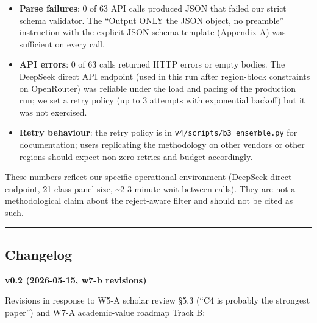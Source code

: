 \documentclass[
  letterpaper,
  11pt]{article}
\providecommand{\tightlist}{%
  \setlength{\itemsep}{0pt}\setlength{\parskip}{0pt}}
\begin{document}
\begin{itemize}
\tightlist
\item
  \textbf{Parse failures}: 0 of 63 API calls produced JSON that failed
  our strict schema validator. The ``Output ONLY the JSON object, no
  preamble'' instruction with the explicit JSON-schema template
  (Appendix A) was sufficient on every call.
\item
  \textbf{API errors}: 0 of 63 calls returned HTTP errors or empty
  bodies. The DeepSeek direct API endpoint (used in this run after
  region-block constraints on OpenRouter) was reliable under the load
  and pacing of the production run; we set a retry policy (up to 3
  attempts with exponential backoff) but it was not exercised.
\item
  \textbf{Retry behaviour}: the retry policy is in
  \texttt{v4/scripts/b3\_ensemble.py} for documentation; users
  replicating the methodology on other vendors or other regions should
  expect non-zero retries and budget accordingly.
\end{itemize}

These numbers reflect our specific operational environment (DeepSeek
direct endpoint, 21-class panel size, \textasciitilde2-3 minute wait
between calls). They are not a methodological claim about the
reject-aware filter and should not be cited as such.

\begin{center}\rule{0.5\linewidth}{0.5pt}\end{center}

\subsection{Changelog}\label{changelog}

\textbf{v0.2 (2026-05-15, w7-b revisions)}

Revisions in response to W5-A scholar review §5.3 (``C4 is probably the
strongest paper'') and W7-A academic-value roadmap Track B:
\end{document}
